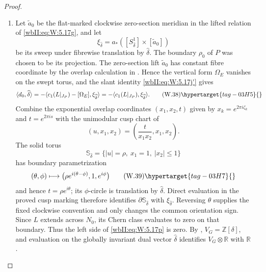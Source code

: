 \begin{proof}

\begin{enumerate}[label=\arabic*.,leftmargin=*]
\item Let $\widetilde a_0$ be the flat-marked clockwise zero-section meridian in
the lifted relation of \eqref{wbII:eq:W:5.17g}, and let
\[
 \xi_{\widehat\delta}
 =a_*([S^1_{\widehat\delta}]\times[\widetilde a_0])
\]
be its sweep under fibrewise translation by $\widehat\delta$.  The boundary
$\rho_0$ of $P$ was chosen to be its projection.  The zero-section
lift $\widetilde a_0$ has constant fibre coordinate by the overlap
calculation in .  Hence the
vertical form $\Omega_E$ vanishes on the swept torus, and the slant identity
\eqref{wbII:eq:W:5.17j'} gives
\[
 \langle d_0,\widehat\delta\rangle
 =-\langle c_1(L|_{J_P})-[\Omega_E],
          \xi_{\widehat\delta}\rangle
 =-\langle c_1(L|_{J_P}),\xi_{\widehat\delta}\rangle.
\tag{W.38}\hypertarget{tag-03H5}{}\label{wbII:eq:W:5.17p}
\]
Combine the exponential overlap coordinates $(x_1,x_2,t)$ given by $x_k=e^{2\pi i\zeta_k}$ and $t=e^{2\pi is}$ with
the unimodular cusp chart of 
\[
 (u,x_1,x_2)=\left(\frac{t}{x_1x_2},x_1,x_2\right).
\]
The solid torus
\[
 \mathbb S_{\widehat\delta}
 =\{|u|=\rho,\ x_1=1,\ |x_2|\le1\}
\]
has boundary parametrization
\[
 (\theta,\phi)\longmapsto
 \bigl(\rho e^{i(\theta-\phi)},1,e^{i\phi}\bigr)
\tag{W.39}\hypertarget{tag-03H7}{}\label{wbII:eq:W:5.17p0}
\]
and hence $t=\rho e^{i\theta}$; its $\phi$-circle is translation by
$\widehat\delta$.  Direct evaluation in the proved cusp marking therefore
identifies $\partial\mathbb S_{\widehat\delta}$ with
$\xi_{\widehat\delta}$.  Reversing $\theta$ supplies the fixed clockwise
convention and only changes the common orientation sign.
Since $L$ extends across $N_0$, its Chern class evaluates to zero on that
boundary.  Thus the left side of \eqref{wbII:eq:W:5.17p} is zero.  By
\cite[Proposition~7.26, pp.~61--62]{AC2026}, $V_G=\mathbb Z[\delta]$, and evaluation on the
globally invariant dual vector $\widehat\delta$ identifies
$V_G\otimes\mathbb R$ with $\mathbb R$.


\end{enumerate}
\end{proof}
